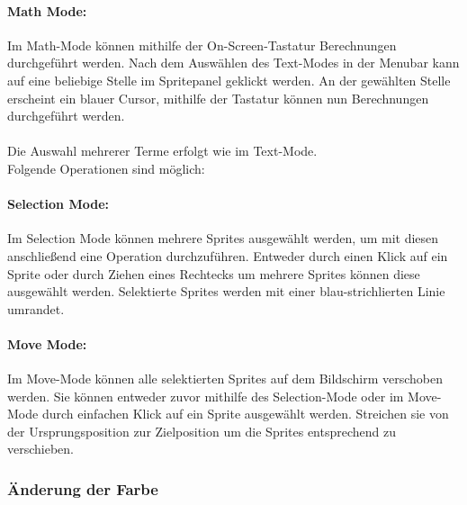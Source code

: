 \paragraph{Math Mode:}

Im Math-Mode können mithilfe der On-Screen-Tastatur Berechnungen durchgeführt werden. Nach dem Auswählen des Text-Modes in der Menubar kann auf eine beliebige Stelle im Spritepanel geklickt werden. An der gewählten Stelle erscheint ein blauer Cursor, mithilfe der Tastatur können nun Berechnungen durchgeführt werden.\\
\\
Die Auswahl mehrerer Terme erfolgt wie im Text-Mode.
\\
Folgende Operationen sind möglich:


\paragraph{Selection Mode:}

Im Selection Mode können mehrere Sprites ausgewählt werden, um mit diesen anschließend eine Operation durchzuführen. Entweder durch einen Klick auf ein Sprite oder durch Ziehen eines Rechtecks um mehrere Sprites können diese ausgewählt werden. Selektierte Sprites werden mit einer blau-strichlierten Linie umrandet.

\paragraph{Move Mode:}

Im Move-Mode können alle selektierten Sprites auf dem Bildschirm verschoben werden. Sie können entweder zuvor mithilfe des Selection-Mode oder im Move-Mode durch einfachen Klick auf ein Sprite ausgewählt werden. Streichen sie von der Ursprungsposition zur Zielposition um die Sprites entsprechend zu verschieben.

\subsubsection{Änderung der Farbe}

